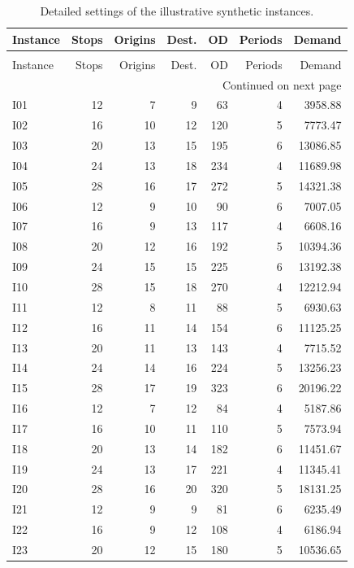 \begingroup
\scriptsize
\setlength{\tabcolsep}{3.5pt}
\begin{longtable}{lrrrrrr}
\caption{Detailed settings of the illustrative synthetic instances.} \label{tab:appendix_illustrative_settings} \\
\toprule
Instance & Stops & Origins & Dest. & OD & Periods & Demand \\
\midrule
\endfirsthead
\caption[]{Detailed settings of the illustrative synthetic instances.} \\
\toprule
Instance & Stops & Origins & Dest. & OD & Periods & Demand \\
\midrule
\endhead
\midrule
\multicolumn{7}{r}{Continued on next page} \\
\midrule
\endfoot
\bottomrule
\endlastfoot
I01 & 12 & 7 & 9 & 63 & 4 & 3958.88 \\
I02 & 16 & 10 & 12 & 120 & 5 & 7773.47 \\
I03 & 20 & 13 & 15 & 195 & 6 & 13086.85 \\
I04 & 24 & 13 & 18 & 234 & 4 & 11689.98 \\
I05 & 28 & 16 & 17 & 272 & 5 & 14321.38 \\
I06 & 12 & 9 & 10 & 90 & 6 & 7007.05 \\
I07 & 16 & 9 & 13 & 117 & 4 & 6608.16 \\
I08 & 20 & 12 & 16 & 192 & 5 & 10394.36 \\
I09 & 24 & 15 & 15 & 225 & 6 & 13192.38 \\
I10 & 28 & 15 & 18 & 270 & 4 & 12212.94 \\
I11 & 12 & 8 & 11 & 88 & 5 & 6930.63 \\
I12 & 16 & 11 & 14 & 154 & 6 & 11125.25 \\
I13 & 20 & 11 & 13 & 143 & 4 & 7715.52 \\
I14 & 24 & 14 & 16 & 224 & 5 & 13256.23 \\
I15 & 28 & 17 & 19 & 323 & 6 & 20196.22 \\
I16 & 12 & 7 & 12 & 84 & 4 & 5187.86 \\
I17 & 16 & 10 & 11 & 110 & 5 & 7573.94 \\
I18 & 20 & 13 & 14 & 182 & 6 & 11451.67 \\
I19 & 24 & 13 & 17 & 221 & 4 & 11345.41 \\
I20 & 28 & 16 & 20 & 320 & 5 & 18131.25 \\
I21 & 12 & 9 & 9 & 81 & 6 & 6235.49 \\
I22 & 16 & 9 & 12 & 108 & 4 & 6186.94 \\
I23 & 20 & 12 & 15 & 180 & 5 & 10536.65 \\

\end{longtable}
